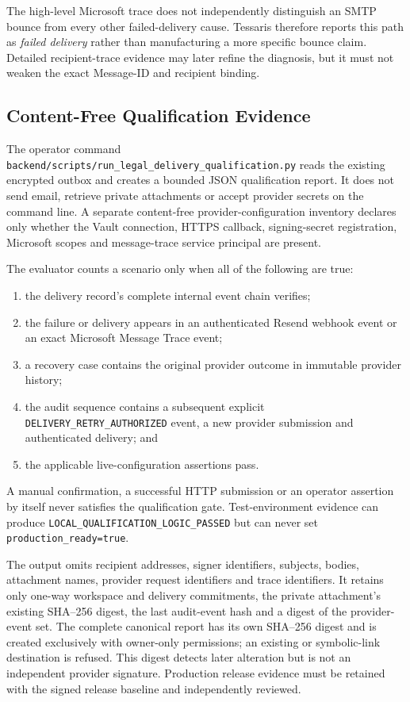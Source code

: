 The high-level Microsoft trace does not independently distinguish an SMTP bounce
from every other failed-delivery cause.  Tessaris therefore reports this path as
\emph{failed delivery} rather than manufacturing a more specific bounce claim.
Detailed recipient-trace evidence may later refine the diagnosis, but it must
not weaken the exact Message-ID and recipient binding.

\subsection{Content-Free Qualification Evidence}

The operator command
\texttt{backend/scripts/run\_legal\_delivery\_qualification.py} reads the
existing encrypted outbox and creates a bounded JSON qualification report.  It
does not send email, retrieve private attachments or accept provider secrets on
the command line.  A separate content-free provider-configuration inventory
declares only whether the Vault connection, HTTPS callback, signing-secret
registration, Microsoft scopes and message-trace service principal are present.

The evaluator counts a scenario only when all of the following are true:

\begin{enumerate}[leftmargin=*]
  \item the delivery record's complete internal event chain verifies;
  \item the failure or delivery appears in an authenticated Resend webhook event
        or an exact Microsoft Message Trace event;
  \item a recovery case contains the original provider outcome in immutable
        provider history;
  \item the audit sequence contains a subsequent explicit
        \texttt{DELIVERY\_RETRY\_AUTHORIZED} event, a new provider submission and
        authenticated delivery; and
  \item the applicable live-configuration assertions pass.
\end{enumerate}

A manual confirmation, a successful HTTP submission or an operator assertion by
itself never satisfies the qualification gate.  Test-environment evidence can
produce \texttt{LOCAL\_QUALIFICATION\_LOGIC\_PASSED} but can never set
\texttt{production\_ready=true}.

The output omits recipient addresses, signer identifiers, subjects, bodies,
attachment names, provider request identifiers and trace identifiers.  It
retains only one-way workspace and delivery commitments, the private
attachment's existing SHA--256 digest, the last audit-event hash and a digest of
the provider-event set.  The complete canonical report has its own SHA--256
digest and is created exclusively with owner-only permissions; an existing or
symbolic-link destination is refused.  This digest detects later alteration but
is not an independent provider signature.  Production release evidence must be
retained with the signed release baseline and independently reviewed.

